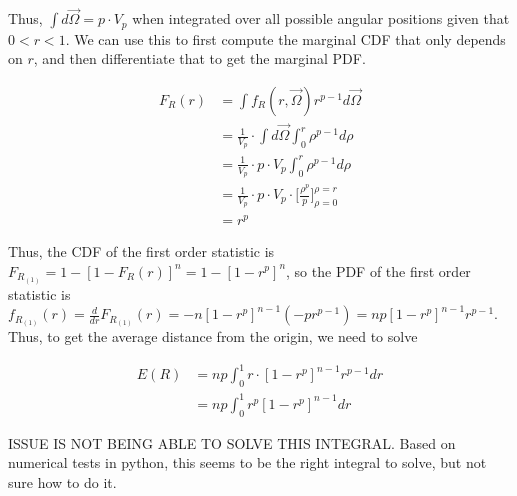 \documentclass[]{article}
\begin{document}
Thus, $\int d\vec{\Omega} = p \cdot V_p$ when integrated over all possible angular positions given that $0<r<1$. We can use this to first compute the marginal CDF that only depends on $r$, and then differentiate that to get the marginal PDF.


\begin{equation}
	\begin{aligned}
		F_R(r) &= \int f_R(r, \vec{\Omega}) r^{p-1} d\vec{\Omega} \\
		&=\frac{1}{V_p} \cdot \int d\vec{\Omega} \int_0^r \rho^{p-1} d\rho \\
		&= \frac{1}{V_p} \cdot p\cdot V_p \int_0^r \rho^{p-1} d\rho \\
		&= \frac{1}{V_p} \cdot p \cdot V_p \cdot \bigg[\frac{\rho^p}{p} \bigg]_{\rho=0}^{\rho=r} \\
		&= r^p
 	\end{aligned}
\end{equation}


Thus, the CDF of the first order statistic is $F_{R_{(1)}} = 1 - [1 - F_R(r)]^n = 1 - [1 - r^p]^n$, so the PDF of the first order statistic is $f_{R_{(1)}}(r) = \frac{d}{dr} F_{R_{(1)}}(r) = -n[1-r^p]^{n-1}(-pr^{p-1})=np[1-r^p]^{n-1}r^{p-1}$. Thus, to get the average distance from the origin, we need to solve

\begin{equation}
	\begin{aligned}
		E(R) &= np\int_0^1 r\cdot [1-r^p]^{n-1}r^{p-1}dr \\
		&= np\int_0^1 r^p [1-r^p]^{n-1}dr
	\end{aligned}
\end{equation}

ISSUE IS NOT BEING ABLE TO SOLVE THIS INTEGRAL. Based on numerical tests in python, this seems to be the right integral to solve, but not sure how to do it.
\end{document}
